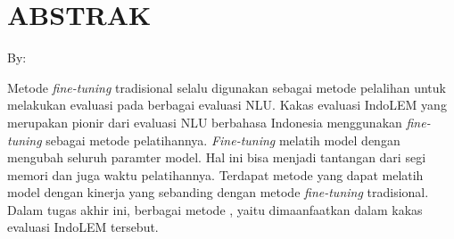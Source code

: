 \clearpage
\chapter*{ABSTRAK}

\begin{center}
    \center
    \begin{singlespace}
        \large\bfseries\MakeUppercase{\thetitle}
    
        \normalfont\normalsize
        By:
    
        \bfseries \theauthor
    \end{singlespace}
\end{center} 

\begin{singlespace}
    Metode \textit{fine-tuning} tradisional selalu digunakan sebagai metode pelalihan untuk melakukan evaluasi pada berbagai evaluasi NLU. Kakas evaluasi IndoLEM yang merupakan pionir dari evaluasi NLU berbahasa Indonesia menggunakan \textit{fine-tuning} sebagai metode pelatihannya. \textit{Fine-tuning} melatih model dengan mengubah seluruh paramter model. Hal ini bisa menjadi tantangan dari segi memori dan juga waktu pelatihannya. Terdapat metode \PEFT yang dapat melatih model dengan kinerja yang sebanding dengan metode \textit{fine-tuning} tradisional. Dalam tugas akhir ini, berbagai metode \PEFT, yaitu \methodPEFT dimaanfaatkan dalam kakas evaluasi IndoLEM tersebut.
\end{singlespace}

\clearpage
